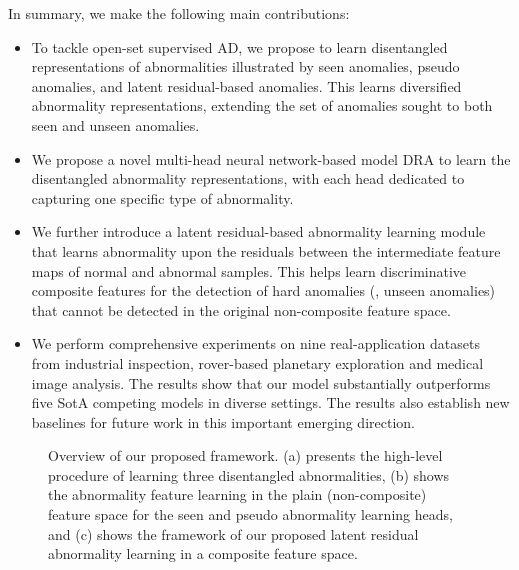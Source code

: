 \documentclass[10pt,twocolumn,letterpaper]{article}
\begin{document}
In summary, we make the following main contributions:
\begin{itemize}
\itemsep -0.1cm 
    \item To tackle open-set supervised AD, we propose to learn disentangled representations of abnormalities illustrated by seen anomalies, pseudo anomalies, and latent residual-based anomalies. This learns diversified abnormality representations, extending the set of anomalies sought to both seen and unseen anomalies.
    \item We propose a novel multi-head neural network-based model DRA to learn the disentangled abnormality representations, with each head dedicated to capturing one specific type of abnormality. 
    \item We further introduce a latent residual-based abnormality learning module that learns abnormality upon the residuals between the intermediate feature maps of normal and abnormal samples. This helps learn discriminative composite features for the detection of hard anomalies (\eg, unseen anomalies) that cannot be detected in the original non-composite feature space.
    \item We perform comprehensive experiments on nine real-application datasets from industrial inspection, rover-based planetary exploration and medical image analysis. The results show that our model substantially outperforms five SotA competing models in diverse settings. The results also establish new baselines for future work in this important emerging direction. 
\end{itemize}
    
\begin{figure*}[t]
\centering     {}
\hspace{1pt}
\vspace{1pt}
\vspace{1pt}
    \vspace{-0.3cm}
\caption{Overview of our proposed framework. (a) presents the high-level procedure of learning three disentangled abnormalities, (b) shows the abnormality feature learning in the plain (non-composite) feature space for the seen and pseudo abnormality learning heads, and (c) shows the framework of our proposed latent residual abnormality learning in a composite feature space.
}
    \vspace{-0.4cm}
\end{figure*}
\end{document}
